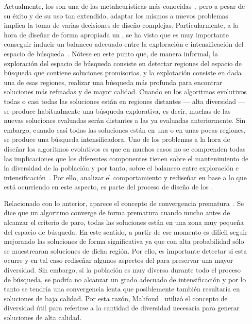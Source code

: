 Actualmente, los \EAS{} son una de las metaheurísticas más conocidas~\cite{glover2005handbook}, pero a pesar de su éxito y de su uso tan extendido, adaptar los mismos
a nuevos problemas implica la toma de varias decisiones de diseño complejas.
%
Particularmente, a la hora de diseñar de forma apropiada un \EA{}, se ha visto que es muy importante conseguir
inducir un balanceo adecuado entre la exploración e intensificación del espacio de búsqueda~\cite{herrera1996adaptation}.
%
Nótese en este punto que, de manera informal, la exploración del espacio de búsqueda consiste en detectar regiones del espacio de búsqueda que contiene soluciones
promisorias, y la explotación consiste en dada una de esas regiones, realizar una búsqueda más profunda para encontrar soluciones más refinadas y de mayor calidad.
%
Cuando en los algoritmos evolutivos todas o casi todas las soluciones están en regiones distantes --- alta diversidad --- se produce habitualmente una búsqueda explorativa, 
es decir, muchas de las nuevas soluciones evaluadas serán distantes a las ya evaluadas anteriormente.
%
Sin embargo, cuando casi todas las soluciones están en una o en unas pocas regiones, se produce una búsqueda intensificadora.
%
Uno de los problemas a la hora de diseñar los algoritmos evolutivos es que en muchos casos no se comprenden todas las implicaciones que los diferentes componentes
tienen sobre el mantenimiento de la diversidad de la población y por tanto, sobre el balanceo entre exploración e intensificación~\cite{Crepinsek:13}.
%
Por ello, analizar el comportamiento y rediseñar en base a lo que está ocurriendo en este aspecto, es parte del proceso de diseño de los \EAS{}.

Relacionado con lo anterior, aparece el concepto de convergencia prematura~\cite{Crepinsek:13}.
%
Se dice que un algoritmo converge de forma prematura cuando mucho antes de alcanzar el criterio de paro, todas las soluciones están en una zona muy pequeña del espacio de búsqueda.
%
En este sentido, a partir de ese momento es difícil seguir mejorando las soluciones de forma significativa ya que con alta probabilidad sólo se muestrearan soluciones de dicha
región.
%
Por ello, es importante detectar si esta ocurre y en tal caso rediseñar algunos aspectos del \EA{}
para preservar una mayor diversidad.
%
Sin embargo, si la población es muy diversa durante todo el proceso de búsqueda, se podría no alcanzar un grado adecuado de intensificación y por lo tanto 
se tendría una convergencia lenta que posiblemente también resultaría en soluciones de baja calidad.
%
Por esta razón, Mahfoud~\cite{dasgupta2013evolutionary} utilizó el concepto de diversidad útil para referirse a la cantidad de diversidad necesaria para generar 
soluciones de alta calidad.

